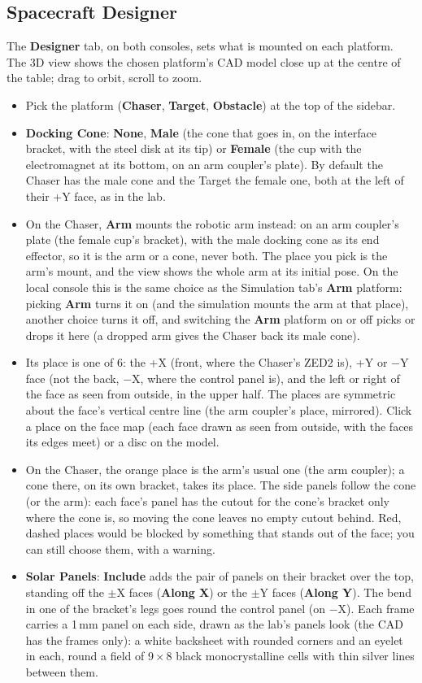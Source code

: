 \documentclass[11pt,a4paper]{article}
\newcommand{\ui}[1]{\textsf{\textbf{#1}}}
\begin{document}
\subsection{Spacecraft Designer}\label{sec:designer}
The \ui{Designer} tab, on both consoles, sets what is mounted on each platform. The 3D view shows the chosen
platform's CAD model close up at the centre of the table; drag to orbit, scroll to zoom.
\begin{itemize}
  \item Pick the platform (\ui{Chaser}, \ui{Target}, \ui{Obstacle}) at the top of the sidebar.
  \item \ui{Docking Cone}: \ui{None}, \ui{Male} (the cone that goes in, on the interface bracket, with the steel disk
        at its tip) or \ui{Female} (the cup with the electromagnet at its bottom, on an arm coupler's plate). By default
        the Chaser has the male cone and the Target the female one, both at the left of their +Y face, as in the lab.
  \item On the Chaser, \ui{Arm} mounts the robotic arm instead: on an arm coupler's plate (the female cup's bracket),
        with the male docking cone as its end effector, so it is the arm or a cone, never both. The place you pick is
        the arm's mount, and the view shows the whole arm at its initial pose. On the local console this is the same
        choice as the Simulation tab's \ui{Arm} platform: picking \ui{Arm} turns it on (and the simulation mounts the arm
        at that place), another choice turns it off, and switching the \ui{Arm} platform on or off picks or drops it
        here (a dropped arm gives the Chaser back its male cone).
  \item Its place is one of 6: the +X (front, where the Chaser's ZED2 is), +Y or $-$Y face (not the back, $-$X, where
        the control panel is), and the left or right of the face as seen from outside, in the upper half. The places are symmetric about the face's
        vertical centre line (the arm coupler's place, mirrored). Click a place on the face map (each face drawn as
        seen from outside, with the faces its edges meet) or a disc on the model.
  \item On the Chaser, the orange place is the arm's usual one (the arm coupler); a cone there, on its own bracket,
        takes its place. The side panels follow the cone (or the arm): each
        face's panel has the cutout for the cone's bracket only where the cone is, so moving the cone leaves no
        empty cutout behind. Red, dashed places would be blocked by something
        that stands out of the face; you can still choose them, with a warning.
  \item \ui{Solar Panels}: \ui{Include} adds the pair of panels on their bracket over the top, standing off the
        $\pm$X faces (\ui{Along X}) or the $\pm$Y faces (\ui{Along Y}). The bend in one of the bracket's legs goes round
        the control panel (on $-$X). Each frame carries a 1\,mm panel on each side, drawn as the lab's panels look (the
        CAD has the frames only): a white backsheet with rounded corners and an eyelet in each, round a field of
        9\,$\times$\,8 black monocrystalline cells with thin silver lines between them.
\end{itemize}
\end{document}
